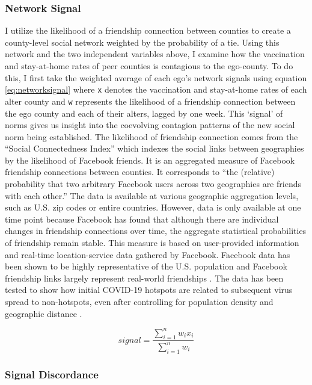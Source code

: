 \hypertarget{network-signal}{%
\subsubsection{Network Signal}\label{network-signal}}

I utilize the likelihood of a friendship connection between counties
to create a county-level social network weighted by the probability of a tie.
Using this network and the two independent variables above, I examine how the
vaccination and stay-at-home rates of peer counties is contagious to the
ego-county. To do this, I first take the weighted average of each ego's network
signals using equation \eqref{eq:networksignal} where \texttt{x} denotes the
vaccination and stay-at-home rates of each alter county and \texttt{w} represents the
likelihood of a friendship connection between the ego county and each of their
alters, lagged by one week. This `signal' of norms gives us insight into the
coevolving contagion patterns of the new social norm being established. The
likelihood of friendship connection comes from the ``Social Connectedness Index''
\citep{Bailey2018, facebook20} which indexes the social links between geographies by
the likelihood of Facebook friends. It is an aggregated measure of Facebook
friendship connections between counties. It corresponds to ``the (relative)
probability that two arbitrary Facebook users across two geographies are friends
with each other.'' The data is available at various geographic aggregation
levels, such as U.S. zip codes or entire countries. However, data is only
available at one time point because Facebook has found that although there are
individual changes in friendship connections over time, the aggregate
statistical probabilities of friendship remain stable. This measure is based on
user-provided information and real-time location-service data gathered by
Facebook. Facebook data has been shown to be highly representative of the U.S.
population and Facebook friendship links largely represent real-world
friendships \citep{bailey_etal18, jones_etal13}. The data has been tested to show
how initial COVID-19 hotspots are related to subsequent virus spread to
non-hotspots, even after controlling for population density and geographic
distance \citep{Kuchler2020}.

\begin{equation}
signal = \frac{\sum_{i=1}^nw_ix_i}{\sum^n_{i=1}w_i} \label{eq:networksignal}
\end{equation}

\hypertarget{signal-discordance}{%
\subsubsection{Signal Discordance}\label{signal-discordance}}

